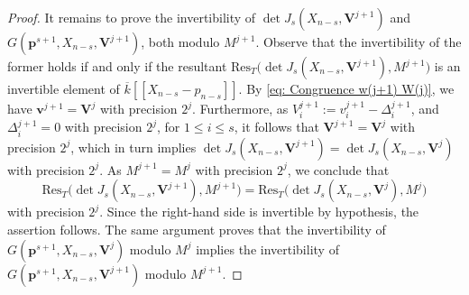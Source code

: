 \documentclass[pdflatex,sn-basic]{sn-jnl}%
\theoremstyle{thmstyleone}%
\theoremstyle{thmstyletwo}%
\theoremstyle{thmstylethree}%
\theoremstyle{definition}
\numberwithin{equation}{section}
\newcommand{\bfs}{\boldsymbol}
\begin{document}
\begin{proof}
It remains to prove the invertibility of $\det J_s( X_{n-s}, \bfs
V^{j+1})$ and $G(\bfs p^{s+1}, X_{n-s}, \bfs V^{j+1})$, both modulo
$M^{j+1}$. Observe that the invertibility of the former holds if and
only if the resultant $\mathrm{Res}_T\big(\det J_s( X_{n-s}, \bfs
V^{j+1}),M^{j+1}\big)$ is an invertible element of
$\overline{k}[\![X_{n-s} -p_{n-s}]\!]$. By \eqref{eq: Congruence
w(j+1) W(j)}, we have $\bfs v^{j+1}=\bfs V^j$ with precision $2^j$.
Furthermore, as $V_i^{j+1}:=v_i^{j+1}- \Delta_i^{j+1}$, and
$\Delta_i^{j+1}=0$ with precision $2^j$, for $1\le i\le s$, it
follows that $\bfs V^{j+1}=\bfs V^j$ with precision $2^j$, which in
turn implies $\det J_s( X_{n-s}, \bfs V^{j+1})=\det J_s(X_{n-s},
\bfs V^j)$ with precision $2^j$. As $M^{j+1}=M^j$ with precision
$2^j$, we conclude that
%
$$\mathrm{Res}_T\big(\det J_s(X_{n-s}, \bfs
V^{j+1}),M^{j+1}\big)=\mathrm{Res}_T\big(\det J_s(
X_{n-s}, \bfs V^j),M^j\big)$$
%
with precision $2^j$. Since the right-hand side is invertible by
hypothesis, the assertion follows. The same argument proves that the
invertibility of $G(\bfs p^{s+1}, X_{n-s}, \bfs V^j)$ modulo $M^j$
implies the invertibility of $G(\bfs p^{s+1}, X_{n-s}, \bfs V^{j+1})$
modulo $M^{j+1}$.
\end{proof}
\end{document}
